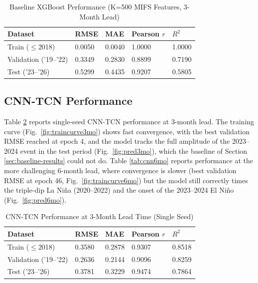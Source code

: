 \documentclass[conference]{IEEEtran}
\begin{document}
\begin{table}[t]
\centering
\caption{Baseline XGBoost Performance (K=500 MIFS Features, 3-Month Lead)}
\label{tab:baseline}
\begin{tabular}{@{}lllll@{}}
\toprule
\textbf{Dataset} & \textbf{RMSE} & \textbf{MAE} & \textbf{Pearson $r$} & \textbf{$R^2$} \\
\midrule
Train ($\leq$2018) & 0.0050 & 0.0040 & 1.0000 & 1.0000 \\
Validation ('19--'22) & 0.3349 & 0.2830 & 0.8899 & 0.7190 \\
Test ('23--'26) & 0.5299 & 0.4435 & 0.9207 & 0.5805 \\
\bottomrule
\end{tabular}
\end{table}

\subsection{CNN-TCN Performance}
Table \ref{tab:cnn3mo} reports single-seed CNN-TCN performance at 3-month lead. The training curve (Fig.\ \ref{fig:traincurve3mo}) shows fast convergence, with the best validation RMSE reached at epoch 4, and the model tracks the full amplitude of the 2023--2024 event in the test period (Fig.\ \ref{fig:pred3mo}), which the baseline of Section \ref{sec:baseline-results} could not do. Table \ref{tab:cnn6mo} reports performance at the more challenging 6-month lead, where convergence is slower (best validation RMSE at epoch 46, Fig.\ \ref{fig:traincurve6mo}) but the model still correctly times the triple-dip La Ni\~na (2020--2022) and the onset of the 2023--2024 El Ni\~no (Fig.\ \ref{fig:pred6mo}).

\begin{table}[t]
\centering
\caption{CNN-TCN Performance at 3-Month Lead Time (Single Seed)}
\label{tab:cnn3mo}
\begin{tabular}{@{}lllll@{}}
\toprule
\textbf{Dataset} & \textbf{RMSE} & \textbf{MAE} & \textbf{Pearson $r$} & \textbf{$R^2$} \\
\midrule
Train ($\leq$2018) & 0.3580 & 0.2878 & 0.9307 & 0.8518 \\
Validation ('19--'22) & 0.2636 & 0.2144 & 0.9096 & 0.8259 \\
Test ('23--'26) & 0.3781 & 0.3229 & 0.9474 & 0.7864 \\
\bottomrule
\end{tabular}
\end{table}
\end{document}
